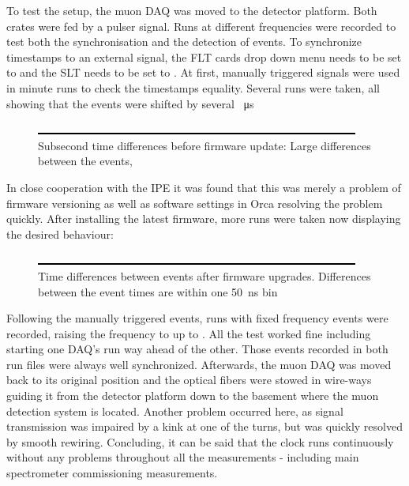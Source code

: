   
  To test the setup, the muon DAQ was moved to the detector platform. Both crates were fed by a pulser signal. Runs at different frequencies were recorded to test both the synchronisation and the detection of events. To synchronize timestamps to an external signal, the FLT cards drop down menu needs to be set to  and the SLT needs to be set to .
  At first, manually triggered signals were used in minute runs to check the timestamps equality. Several runs were taken, all showing that the events were shifted by several \SI{}{\micro\second}
  \begin{figure}
  	\includegraphics[width = 0.9 \textwidth]{graphics/dummy.eps}
  	\caption{Subsecond time differences before firmware update: Large differences between the events, }
  \end{figure}

  In close cooperation with the IPE it was found that this was merely a problem of firmware versioning as well as software settings in Orca resolving the problem quickly. After installing the latest firmware, more runs were taken now displaying the desired behaviour:
  \begin{figure}
	\caption{Time differences between events after firmware upgrades. Differences between the event times are within one \SI{50}{\nano\second} bin}
  	\includegraphics[width = 0.9 \textwidth]{graphics/dummy.eps}
  \end{figure}
  Following the manually triggered events, runs with fixed frequency events were recorded, raising the frequency to up to . All the test worked fine including starting one DAQ's run way ahead of the other. Those events recorded in both run files were always well synchronized.
  Afterwards, the muon DAQ was moved back to its original position and the optical fibers were stowed in wire-ways guiding it from the detector platform down to the basement where the muon detection system is located. Another problem occurred here, as signal transmission was impaired by a kink at one of the turns, but was quickly resolved by smooth rewiring.
  Concluding, it can be said that the clock runs continuously without any problems throughout all the measurements - including main spectrometer commissioning measurements.

  
